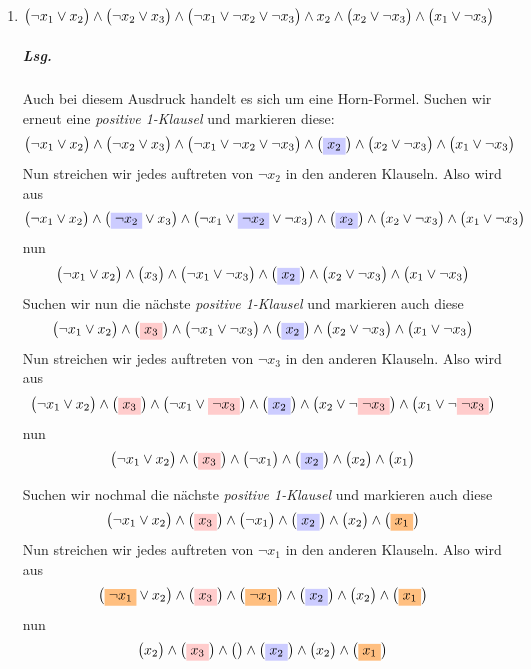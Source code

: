 \documentclass{scrreprt}
\begin{document}
\begin{enumerate}[(1)]
\item $\qty\big(\neg x_1 \lor x_2) \land
  \qty\big(\neg x_2 \lor x_3) \land
  \qty\big(\neg x_1 \lor \neg x_2 \lor \neg x_3) \land x_2 \land
  \qty\big(x_2 \lor \neg x_3) \land
  \qty\big(x_1 \lor \neg x_3)$

  \subparagraph{Lsg.}  Auch bei diesem Ausdruck handelt es sich um eine
  Horn-Formel.
  Suchen wir erneut eine \emph{positive 1-Klausel} und markieren diese:
  \[
    \qty\big(\neg x_1 \lor x_2) \land
    \qty\big(\neg x_2 \lor x_3) \land
    \qty\big(\neg x_1 \lor \neg x_2 \lor \neg x_3) \land
    \qty\big(\colorbox{blue!20}{$x_2$}) \land
    \qty\big(x_2 \lor \neg x_3) \land
    \qty\big(x_1 \lor \neg x_3)
  \]
  Nun streichen wir jedes auftreten von $\neg x_2$ in den anderen Klauseln.
  Also wird aus
  \[
    \qty\big(\neg x_1 \lor x_2) \land
    \qty\big(\colorbox{blue!20}{$\neg x_2$} \lor x_3) \land
    \qty\big(\neg x_1 \lor \colorbox{blue!20}{$\neg x_2$} \lor \neg x_3) \land
    \qty\big(\colorbox{blue!20}{$x_2$}) \land
    \qty\big(x_2 \lor \neg x_3) \land
    \qty\big(x_1 \lor \neg x_3)
  \]
  nun
  \[
    \qty\big(\neg x_1 \lor x_2) \land
    \qty\big(x_3) \land
    \qty\big(\neg x_1 \lor \neg x_3) \land
    \qty\big(\colorbox{blue!20}{$x_2$}) \land
    \qty\big(x_2 \lor \neg x_3) \land
    \qty\big(x_1 \lor \neg x_3)
  \]
  Suchen wir nun die nächste \emph{positive 1-Klausel} und markieren auch diese
  \[
    \qty\big(\neg x_1 \lor x_2) \land
    \qty\big(\colorbox{red!20}{$x_3$}) \land
    \qty\big(\neg x_1 \lor \neg x_3) \land
    \qty\big(\colorbox{blue!20}{$x_2$}) \land
    \qty\big(x_2 \lor \neg x_3) \land
    \qty\big(x_1 \lor \neg x_3)
  \]
  Nun streichen wir jedes auftreten von $\neg x_3$ in den anderen Klauseln.
  Also wird aus
  \[
    \qty\big(\neg x_1 \lor x_2) \land
    \qty\big(\colorbox{red!20}{$x_3$}) \land
    \qty\big(\neg x_1 \lor \colorbox{red!20}{$\neg x_3$}) \land
    \qty\big(\colorbox{blue!20}{$x_2$}) \land
    \qty\big(x_2 \lor \neg \colorbox{red!20}{$\neg x_3$}) \land
    \qty\big(x_1 \lor \neg \colorbox{red!20}{$\neg x_3$})
  \]
  nun
  \[
    \qty\big(\neg x_1 \lor x_2) \land
    \qty\big(\colorbox{red!20}{$x_3$}) \land
    \qty\big(\neg x_1) \land
    \qty\big(\colorbox{blue!20}{$x_2$}) \land
    \qty\big(x_2) \land
    \qty\big(x_1)
  \]

  Suchen wir nochmal die nächste \emph{positive 1-Klausel} und markieren auch diese
  \[
    \qty\big(\neg x_1 \lor x_2) \land
    \qty\big(\colorbox{red!20}{$x_3$}) \land
    \qty\big(\neg x_1) \land
    \qty\big(\colorbox{blue!20}{$x_2$}) \land
    \qty\big(x_2) \land
    \qty\big(\colorbox{orange!50}{$x_1$})
  \]
  Nun streichen wir jedes auftreten von $\neg x_1$ in den anderen Klauseln.
  Also wird aus
  \[
    \qty\big(\colorbox{orange!50}{$\neg x_1$} \lor x_2) \land
    \qty\big(\colorbox{red!20}{$x_3$}) \land
    \qty\big(\colorbox{orange!50}{$\neg x_1$}) \land
    \qty\big(\colorbox{blue!20}{$x_2$}) \land
    \qty\big(x_2) \land
    \qty\big(\colorbox{orange!50}{$x_1$})
  \]
  nun
  \[
    \qty\big(x_2) \land
    \qty\big(\colorbox{red!20}{$x_3$}) \land
    \qty\big() \land
    \qty\big(\colorbox{blue!20}{$x_2$}) \land
    \qty\big(x_2) \land
    \qty\big(\colorbox{orange!50}{$x_1$})
  \]


\end{enumerate}
\end{document}

